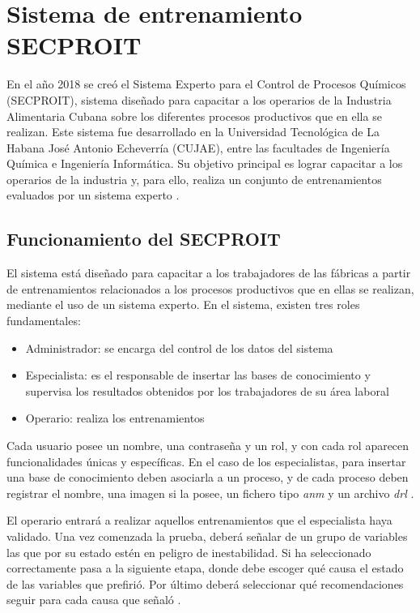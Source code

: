 
\section{Sistema de entrenamiento SECPROIT}
En el año 2018 se creó el Sistema Experto para el Control de Procesos Químicos (SECPROIT), sistema diseñado para capacitar a los operarios de la Industria Alimentaria Cubana sobre los diferentes procesos productivos que en ella se realizan. Este sistema fue desarrollado en la Universidad Tecnológica de La Habana José Antonio Echeverría (CUJAE), entre las facultades de Ingeniería Química e Ingeniería Informática. Su objetivo principal es lograr capacitar a los operarios de la industria y, para ello, realiza un conjunto de entrenamientos evaluados por un sistema experto \cite{ElenaAcostaGil2018}.

\subsection{Funcionamiento del SECPROIT}
El sistema está diseñado para capacitar a los trabajadores de las fábricas a partir de entrenamientos relacionados a los procesos productivos que en ellas se realizan, mediante el uso de un sistema experto. En el sistema, existen tres roles fundamentales: 

\begin{itemize}
\item Administrador: se encarga del control de los datos del sistema
\item Especialista: es el responsable de insertar las bases de conocimiento y supervisa los resultados obtenidos por los trabajadores de su área laboral
\item Operario: realiza los entrenamientos
\end{itemize}

Cada usuario posee un nombre, una contraseña y un rol, y con cada rol aparecen funcionalidades únicas y específicas. En el caso de los especialistas, para insertar una base de conocimiento deben asociarla a un proceso, y de cada proceso deben registrar el nombre, una imagen si la posee, un fichero tipo \textsl{anm} y un archivo \textsl{drl} \cite{Lemus2018}.

El operario entrará a realizar aquellos entrenamientos que el especialista haya validado. Una vez comenzada la prueba, deberá señalar de un grupo de variables las que por su estado estén en peligro de inestabilidad. Si ha seleccionado correctamente pasa a la siguiente etapa, donde debe escoger qué causa el estado de las variables que prefirió. Por último deberá seleccionar qué recomendaciones seguir para cada causa que señaló \cite{ElenaAcostaGil2018}.

